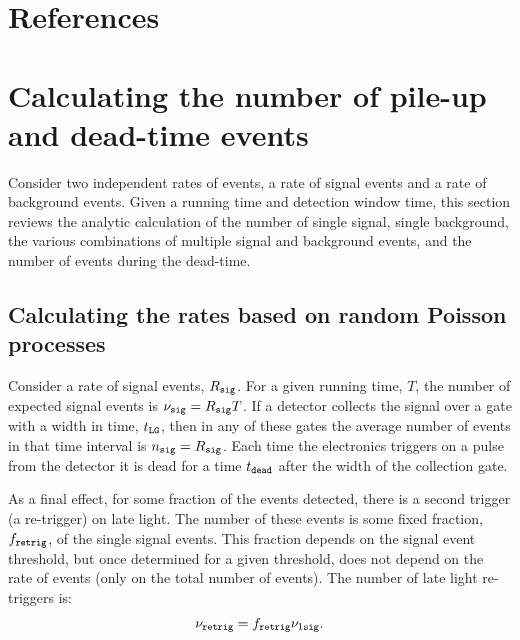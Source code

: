 \documentclass[letter,twocolumn,preprint,3p]{elsarticle}
\begin{document}
\section*{References}


%
%

\appendix

\section{Calculating the number of pile-up and dead-time events}\label{sec:stats}

Consider two independent rates of events, a rate of signal events and
a rate of background events.  Given a running time and detection
window time, this section reviews the analytic calculation of the
number of single signal, single background, the various combinations
of multiple signal and background events, and the number of events
during the dead-time.

\subsection{Calculating the rates based on random Poisson processes}

Consider a rate of signal events, $R_{\tt sig}$.  For a given running
time, $T$, the number of expected signal events is $\nu_{\tt sig} =
R_{\tt sig} T$.  If a detector collects the signal over a gate with a
width in time, $t_{\tt LG}$, then in any of these gates the average
number of events in that time interval is $n_{\tt sig} = R_{\tt sig}$.
Each time the electronics triggers on a pulse from the detector it is
dead for a time $t_{\tt dead}$ after the width of the collection gate.

As a final effect, for some fraction of the events detected, there is
a second trigger (a re-trigger) on late light.  The number of these
events is some fixed fraction, $f_{\tt retrig}$, of the single signal
events.  This fraction depends on the signal event threshold, but once
determined for a given threshold, does not depend on the rate of
events (only on the total number of events).  The number of late light
re-triggers is:
\begin{equation}\label{eq:retrig}
\nu_{\tt retrig} = f_{\tt retrig} \nu_{1\tt sig}.
\end{equation}
\end{document}
